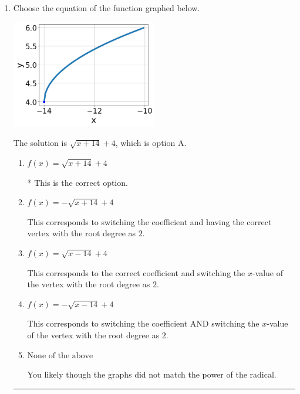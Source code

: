 \documentclass{extbook}[14pt]
\newcommand{\litem}[1]{\item #1

\rule{\textwidth}{0.4pt}}
\begin{document}
\begin{enumerate}\litem{
Choose the equation of the function graphed below.

\begin{center}
    \includegraphics[width=0.5\textwidth]{../Figures/radicalGraphToEquationC.png}
\end{center}


The solution is \( \sqrt{x + 14} + 4 \), which is option A.\begin{enumerate}[label=\Alph*.]
\item \( f(x) = \sqrt{x + 14} + 4 \)

* This is the correct option.
\item \( f(x) = - \sqrt{x + 14} + 4 \)

This corresponds to switching the coefficient and having the correct vertex with the root degree as $2$.
\item \( f(x) = \sqrt{x - 14} + 4 \)

This corresponds to the correct coefficient and switching the $x$-value of the vertex with the root degree as $2$.
\item \( f(x) = - \sqrt{x - 14} + 4 \)

This corresponds to switching the coefficient AND switching the $x$-value of the vertex with the root degree as $2$.
\item \( \text{None of the above} \)

You likely though the graphs did not match the power of the radical.
\end{enumerate}

}
\end{enumerate}
\end{document}
